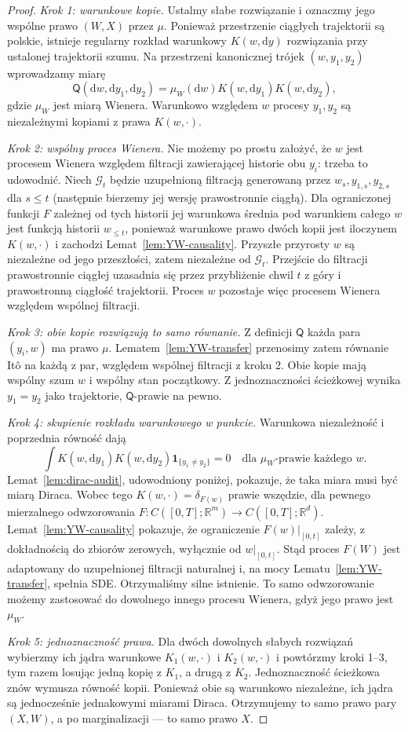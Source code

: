 \documentclass[11pt,a4paper,oneside]{report}
\numberwithin{equation}{chapter}
\theoremstyle{plain}
\theoremstyle{definition}
\theoremstyle{remark}
\newcommand{\R}{\mathbb{R}}
\newcommand{\calG}{\mathcal{G}}
\newcommand{\ind}[1]{\mathbf{1}_{#1}}
\newcommand{\dd}{\mathrm{d}}
\begin{document}
\begin{proof}
\emph{Krok 1: warunkowe kopie.} Ustalmy słabe rozwiązanie
i oznaczmy jego wspólne prawo $(W,X)$ przez $\mu$.
Ponieważ przestrzenie ciągłych trajektorii są polskie,
istnieje regularny rozkład warunkowy $K(w,\dd y)$
rozwiązania przy ustalonej trajektorii szumu.
Na przestrzeni kanonicznej trójek $(w,y_1,y_2)$
wprowadzamy miarę
\[
 \mathsf Q(\dd w,\dd y_1,\dd y_2)
 =\mu_W(\dd w)K(w,\dd y_1)K(w,\dd y_2),
\]
gdzie $\mu_W$ jest miarą Wienera. Warunkowo względem
$w$ procesy $y_1,y_2$ są niezależnymi kopiami z prawa
$K(w,\cdot)$.

\emph{Krok 2: wspólny proces Wienera.} Nie możemy po prostu
założyć, że $w$ jest procesem Wienera względem filtracji
zawierającej historie obu $y_i$: trzeba to udowodnić.
Niech $\calG_t$ będzie uzupełnioną filtracją generowaną
przez $w_s,y_{1,s},y_{2,s}$ dla $s\le t$ (następnie bierzemy
jej wersję prawostronnie ciągłą). Dla ograniczonej funkcji
$F$ zależnej od tych historii jej warunkowa średnia pod
warunkiem całego $w$ jest funkcją historii $w_{\le t}$,
ponieważ warunkowe prawo dwóch kopii jest iloczynem
$K(w,\cdot)$ i zachodzi Lemat~\ref{lem:YW-causality}.
Przyszłe przyrosty $w$ są niezależne od jego przeszłości,
zatem niezależne od $\calG_t$. Przejście do filtracji
prawostronnie ciągłej uzasadnia się przez przybliżenie
chwil $t$ z góry i prawostronną ciągłość trajektorii.
Proces $w$ pozostaje więc procesem Wienera względem
wspólnej filtracji.

\emph{Krok 3: obie kopie rozwiązują to samo równanie.}
Z definicji $\mathsf Q$ każda para $(y_i,w)$ ma prawo
$\mu$. Lematem~\ref{lem:YW-transfer} przenosimy zatem
równanie Itô na każdą z par, względem wspólnej filtracji
z kroku 2. Obie kopie mają wspólny szum $w$ i wspólny
stan początkowy. Z jednoznaczności ścieżkowej wynika
$y_1=y_2$ jako trajektorie, $\mathsf Q$-prawie na pewno.

\emph{Krok 4: skupienie rozkładu warunkowego w punkcie.}
Warunkowa niezależność i poprzednia równość dają
\[
 \int K(w,\dd y_1)K(w,\dd y_2)
 \ind{\{y_1\ne y_2\}}=0
 \quad\text{dla }\mu_W\text{-prawie każdego }w.
\]
Lemat~\ref{lem:dirac-audit}, udowodniony poniżej,
pokazuje, że taka miara musi być miarą Diraca.
Wobec tego $K(w,\cdot)=\delta_{F(w)}$ prawie wszędzie,
dla pewnego mierzalnego odwzorowania
$F:C([0,T];\R^m)\to C([0,T];\R^d)$.
Lemat~\ref{lem:YW-causality} pokazuje, że ograniczenie
$F(w)|_{[0,t]}$ zależy, z dokładnością do zbiorów zerowych,
wyłącznie od $w|_{[0,t]}$. Stąd proces $F(W)$ jest
adaptowany do uzupełnionej filtracji naturalnej i,
na mocy Lematu~\ref{lem:YW-transfer}, spełnia SDE.
Otrzymaliśmy silne istnienie. To samo odwzorowanie możemy
zastosować do dowolnego innego procesu Wienera, gdyż jego
prawo jest $\mu_W$.

\emph{Krok 5: jednoznaczność prawa.} Dla dwóch dowolnych
słabych rozwiązań wybierzmy ich jądra warunkowe
$K_1(w,\cdot)$ i $K_2(w,\cdot)$ i powtórzmy kroki 1--3,
tym razem losując jedną kopię z $K_1$, a drugą z $K_2$.
Jednoznaczność ścieżkowa znów wymusza równość kopii.
Ponieważ obie są warunkowo niezależne, ich jądra są
jednocześnie jednakowymi miarami Diraca. Otrzymujemy
to samo prawo pary $(X,W)$, a po marginalizacji ---
to samo prawo $X$.
\end{proof}
\end{document}

